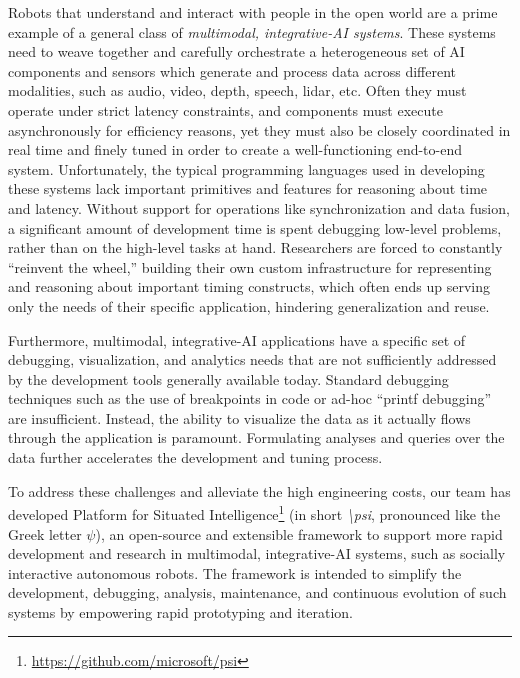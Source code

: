 \documentclass[letterpaper]{article}
\newcommand{\psifnospace}{\emph{\textbackslash psi}}
\begin{document}
Robots that understand and interact with people in the open world are a prime example of a general class of \emph{multimodal, integrative-AI systems}. These systems need to weave together and carefully orchestrate a heterogeneous set of AI components and sensors which generate and process data across different modalities, such as audio, video, depth, speech, lidar, etc. Often they must operate under strict latency constraints, and components must execute asynchronously for efficiency reasons, yet they must also be closely coordinated in real time and finely tuned in order to create a well-functioning end-to-end system. Unfortunately, the typical programming languages used in developing these systems lack important primitives and features for reasoning about time and latency. Without support for operations like synchronization and data fusion, a significant amount of development time is spent debugging low-level problems, rather than on the high-level tasks at hand. Researchers are forced to constantly ``reinvent the wheel,'' building their own custom infrastructure for representing and reasoning about important timing constructs, which often ends up serving only the needs of their specific application, hindering generalization and reuse.

Furthermore, multimodal, integrative-AI applications have a specific set of debugging, visualization, and analytics needs that are not sufficiently addressed by the development tools generally available today. Standard debugging techniques such as the use of breakpoints in code or ad-hoc ``printf debugging'' are insufficient. Instead, the ability to visualize the data as it actually flows through the application is paramount. Formulating analyses and queries over the data further accelerates the development and tuning process.

To address these challenges and alleviate the high engineering costs, our team has developed Platform for Situated Intelligence\footnote{\url{https://github.com/microsoft/psi}} (in short \psifnospace, pronounced like the Greek letter $\psi$), an open-source  and extensible framework to support more rapid development and research in multimodal, integrative-AI systems, such as socially interactive autonomous robots. The framework is intended to simplify the development, debugging, analysis, maintenance, and continuous evolution of such systems by empowering rapid prototyping and iteration.
\end{document}
